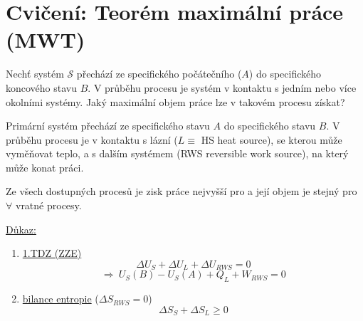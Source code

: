 \section{Cvičení: Teorém maximální práce (MWT)}

\begin{priklad}[Otázka]
Nechť systém $\mathcal{S}$ přechází ze specifického počátečního ($A$) do specifického koncového stavu $B$. V průběhu procesu je systém v kontaktu s jedním nebo více okolními systémy. Jaký maximální objem práce lze v takovém procesu získat?
\end{priklad}

\begin{veta}
Primární systém přechází ze specifického stavu $A$ do specifického stavu $B$. V průběhu procesu je v kontaktu s lázní ($L \equiv$ HS \textcolor{NavyBlue}{\small heat source}), se kterou může vyměňovat teplo, a s dalším systémem (RWS \textcolor{NavyBlue}{\small reversible work source}), na který může konat práci.

Ze všech dostupných procesů je zisk práce nejvyšší pro  a její objem je stejný pro $\forall$ vratné procesy.
\end{veta}

\begin{minipage}{0.42\textwidth}
\end{minipage}
\begin{minipage}{0.56\textwidth}
\underline{Důkaz:}
\begin{enumerate}[label=\arabic*)]
  \item \underline{1.TDZ (ZZE)}
  \[ \Delta U_S + \Delta U_L + \Delta U_{RWS} = 0 \]
  \[ \Rightarrow\ \boxed{U_S(B) - U_S(A) + Q_L + W_{RWS} = 0} \]
  \item \underline{bilance entropie} ($\Delta S_{RWS} = 0$)
  \[ \boxed{\Delta S_S + \Delta S_L \geq 0} \]
\end{enumerate}
\end{minipage}

